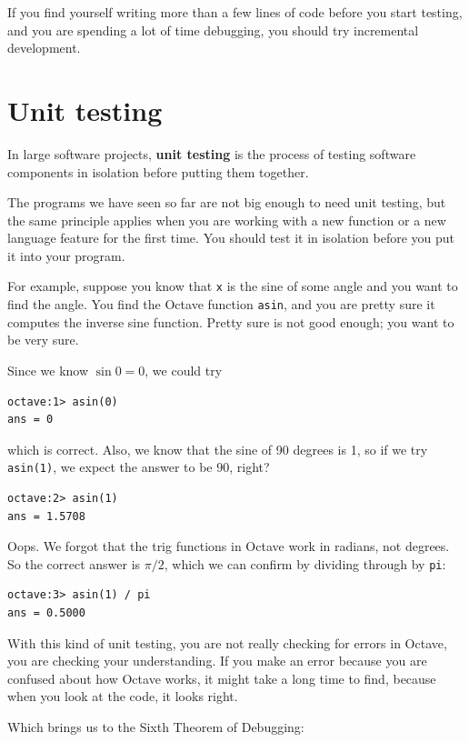 \documentclass{book}
\begin{document}
If you find yourself writing more than a few lines of code before
you start testing, and you are spending a lot of time debugging,
you should try incremental development.

\section{Unit testing}

In large software projects, {\bf unit testing} is the process of
testing software components in isolation before putting
them together.

The programs we have seen so far are not
big enough to need unit testing, but the same principle applies
when you are working with a new function or a new language feature
for the first time. You should test it in isolation before you
put it into your program.

For example, suppose you know that {\tt x} is the sine of some
angle and you want to find the angle. You find the Octave function
{\tt asin}, and you are pretty sure it computes the inverse sine
function. Pretty sure is not good enough; you want to be very sure.

Since we know $\sin 0 = 0$, we could try

\begin{verbatim}
octave:1> asin(0)
ans = 0
\end{verbatim}

which is correct. Also, we know that the sine of 90 degrees is
1, so if we try {\tt asin(1)}, we expect the answer to be 90, right?

\begin{verbatim}
octave:2> asin(1)
ans = 1.5708
\end{verbatim}

Oops. We forgot that the trig functions in Octave work in radians,
not degrees. So the correct answer is $\pi/2$, which we can
confirm by dividing through by {\tt pi}:

\begin{verbatim}
octave:3> asin(1) / pi
ans = 0.5000
\end{verbatim}

With this kind of unit testing, you are not really checking for
errors in Octave, you are checking your understanding. If you
make an error because you are confused about how Octave works, it
might take a long time to find, because when you look at the code,
it looks right. 

Which brings us to the Sixth Theorem of Debugging:
\end{document}

